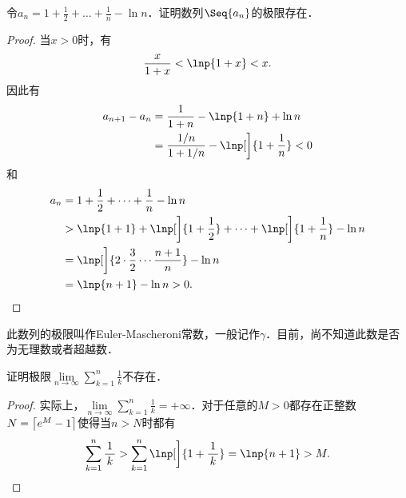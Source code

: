 \begin{example*}
  令\(a_n = 1 + \frac12 + \dots + \frac1n - \ln n\)．证明数列\(\Seq{a_n}\)的极限存在．\rule{0ex}{3.5ex}

  \begin{proof}
    当\(x > 0\)时，有
    \begin{equation*}
      \frac{x}{1+x} < \lnp{1+x} < x.
    \end{equation*}
    因此有
    \begin{align*}
      a_{n+1} - a_n
      &= \frac{1}{1+n} - \lnp{1+n} + \ln n \\
      &= \frac{1/n}{1+1/n} - \lnp[\bigg]{1+\frac1n} < 0
    \end{align*}
    和
    \begin{align*}
      a_n
      &= 1 + \frac12 + \dots + \frac1n - \ln n \\
      &> \lnp{1+1} + \lnp[\bigg]{1+\frac12} + \dots + \lnp[\bigg]{1+\frac1n} - \ln n \\
      &= \lnp[\bigg]{2 \cdot \frac32 \dotsm \frac{n+1}{n}} - \ln n \\
      &= \lnp{n + 1} - \ln n > 0. \qedhere
    \end{align*}
  \end{proof}

  \begin{remark}
    此数列的极限叫作Euler-Mascheroni常数，一般记作\(γ\)．目前，尚不知道此数是否为无理数或者超越数．
  \end{remark}
\end{example*}

\begin{example*}
  证明极限\(\lim\limits_{n\to\infty} \sum\limits_{k=1}^n \! \frac1k\)不存在．

  \begin{proof}
    实际上，\(\lim\limits_{n\to\infty} \sum\limits_{k=1}^n \! \frac1k = +∞\)．对于任意的\(M > 0\)都存在正整数\(N = \ceil[\big]{e^M-1}\)使得当\(n > N\)时都有
    \begin{equation*}
      \sum_{k=1}^n \frac1{\,k\,}
      > \sum_{k=1}^n \lnp[\bigg]{1+\frac1{\,k\,}}
      = \lnp{n+1} > M.
      \qedhere
    \end{equation*}
  \end{proof}
\end{example*}


